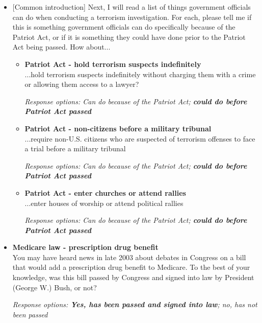 \documentclass[12pt, letterpaper]{article}
\begin{document}
\begin{itemize}

\item{[Common introduction] Next, I will read a list of things government officials can do when conducting a terrorism investigation. For each, please tell me if this is something government officials can do specifically because of the Patriot Act, or if it is something they could have done prior to the Patriot Act being passed. How about...

\begin{itemize}
\item \textbf{Patriot Act - hold terrorism suspects indefinitely}\\
...hold terrorism suspects indefinitely without charging them with a crime or allowing them access to a lawyer?

\textit{Response options: Can do because of the Patriot Act; \textbf{could do before Patriot Act passed}} 
\end{itemize}}

\begin{itemize}
\item \textbf{Patriot Act - non-citizens before a military tribunal}\\
...require non-U.S. citizens who are suspected of terrorism offenses to face a trial before a military tribunal

\textit{Response options: Can do because of the Patriot Act; \textbf{could do before Patriot Act passed}} 
\end{itemize}

\begin{itemize}
\item \textbf{Patriot Act - enter churches or attend rallies}\\
...enter houses of worship or attend political rallies

\textit{Response options: Can do because of the Patriot Act; \textbf{could do before Patriot Act passed}} 
\end{itemize}

\end{itemize}

\begin{itemize} 
\item \textbf{Medicare law - prescription drug benefit}\\
You may have heard news in late 2003 about debates in Congress on a bill that would add a prescription drug benefit to Medicare. To the best of your knowledge, was this bill passed by Congress and signed into law by President (George W.) Bush, or not?

\textit{Response options: \textbf{Yes, has been passed and signed into law}; no, has not been passed}
\end{itemize}
\end{document}
